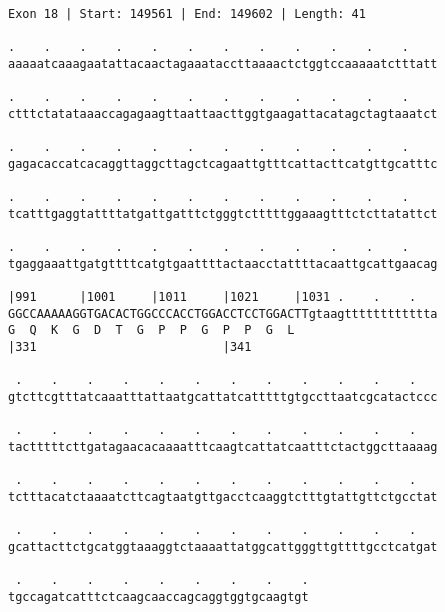 \documentclass{article}
\begin{document}
\begin{Verbatim}[fontfamily=courier]
Exon 18 | Start: 149561 | End: 149602 | Length: 41

.    .    .    .    .    .    .    .    .    .    .    .    
aaaaatcaaagaatattacaactagaaataccttaaaactctggtccaaaaatctttatt

.    .    .    .    .    .    .    .    .    .    .    .    
ctttctatataaaccagagaagttaattaacttggtgaagattacatagctagtaaatct

.    .    .    .    .    .    .    .    .    .    .    .    
gagacaccatcacaggttaggcttagctcagaattgtttcattacttcatgttgcatttc

.    .    .    .    .    .    .    .    .    .    .    .    
tcatttgaggtattttatgattgatttctgggtctttttggaaagtttctcttatattct

.    .    .    .    .    .    .    .    .    .    .    .    
tgaggaaattgatgttttcatgtgaattttactaacctattttacaattgcattgaacag

|991      |1001     |1011     |1021     |1031 .    .    .   
GGCCAAAAAGGTGACACTGGCCCACCTGGACCTCCTGGACTTgtaagtttttttttttta
G  Q  K  G  D  T  G  P  P  G  P  P  G  L                    
|331                          |341                          

 .    .    .    .    .    .    .    .    .    .    .    .   
gtcttcgtttatcaaatttattaatgcattatcatttttgtgccttaatcgcatactccc

 .    .    .    .    .    .    .    .    .    .    .    .   
tactttttcttgatagaacacaaaatttcaagtcattatcaatttctactggcttaaaag

 .    .    .    .    .    .    .    .    .    .    .    .   
tctttacatctaaaatcttcagtaatgttgacctcaaggtctttgtattgttctgcctat

 .    .    .    .    .    .    .    .    .    .    .    .   
gcattacttctgcatggtaaaggtctaaaattatggcattgggttgttttgcctcatgat

 .    .    .    .    .    .    .    .    .
tgccagatcatttctcaagcaaccagcaggtggtgcaagtgt
\end{Verbatim}
\newpage
\end{document}
